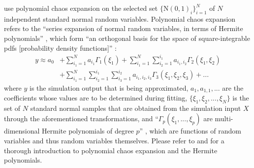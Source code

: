\citeauthor{srsm-phd-1999} use polynomial chaos expansion on the selected set $\{\text{N}(0, 1)_i\}_{i=1}^{N}$ of $N$ independent standard normal random variables. Polynomial chaos expansion \cite{polynomial-chaos-1938} refers to the ``series expansion of normal random variables, in terms of Hermite polynomials'' \cite[p.~44]{srsm-phd-1999}, which form ``an orthogonal basis for the space of square-integrable pdfs [probability density functions]'' \cite[p.~44]{srsm-phd-1999}:
\begin{equation} \label{eq:polynomial-chaos}
    \begin{split}
        y \approx a_0 &+ \sum_{i_1 = 1}^{N} a_{i_1} \Gamma_1(\xi_1) + \sum_{i_1 = 1}^{N} \sum_{i_2 = 1}^{i_1} a_{i_1,i_2} \Gamma_2(\xi_1, \xi_2) \\ &+ \sum_{i_1 = 1}^{N} \sum_{i_2 = 1}^{i_1} \sum_{i_3 = 1}^{i_2} a_{i_1,i_2,i_3} \Gamma_3(\xi_1, \xi_2, \xi_3) + ...
    \end{split}
\end{equation}
where $y$ is the simulation output that is being approximated, $a_1, a_{1,1}, ...$ are the coefficients whose values are to be determined during fitting, $\{ \xi_1, \xi_2, ..., \xi_N \}$ is the set of $N$ standard normal samples that are obtained from the simulation input $X$ through the aforementioned transformations, and ``$\Gamma_p(\xi_1, ..., \xi_p)$ are multi-dimensional Hermite polynomials of degree $p$'' \cite[p.~45]{srsm-phd-1999}, which are functions of random variables and thus random variables themselves. Please refer to \textcite{polynomial-chaos-1938} and \textcite{polynomial-chaos-1991} for a thorough introduction to polynomial chaos expansion and the Hermite polynomials.

